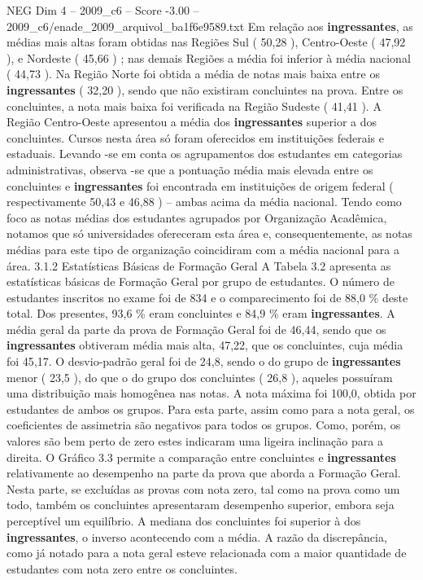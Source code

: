 \begin{textsample}{NEG Dim 4 – 2009\_c6 – Score -3.00 – 2009\_c6/enade\_2009\_arquivol\_ba1f6e9589.txt}
Em relação aos \textbf{ingressantes}, as médias mais altas foram obtidas nas Regiões Sul ( 50,28 ), Centro-Oeste ( 47,92 ), e Nordeste ( 45,66 ) ; nas demais Regiões a média foi inferior à média nacional ( 44,73 ).
Na Região Norte foi obtida a média de notas mais baixa entre os \textbf{ingressantes} ( 32,20 ), sendo que não existiram concluintes na prova.
Entre os concluintes, a nota mais baixa foi verificada na Região Sudeste ( 41,41 ).
A Região Centro-Oeste apresentou a média dos \textbf{ingressantes} superior a dos concluintes.
Cursos nesta área só foram oferecidos em instituições federais e estaduais.
Levando -se em conta os agrupamentos dos estudantes em categorias administrativas, observa -se que a pontuação média mais elevada entre os concluintes e \textbf{ingressantes} foi encontrada em instituições de origem federal ( respectivamente 50,43 e 46,88 ) – ambas acima da média nacional.
Tendo como foco as notas médias dos estudantes agrupados por Organização Acadêmica, notamos que só universidades ofereceram esta área e, consequentemente, as notas médias para este tipo de organização coincidiram com a média nacional para a área. 3.1.2 Estatísticas Básicas de Formação Geral A Tabela 3.2 apresenta as estatísticas básicas de Formação Geral por grupo de estudantes.
O número de estudantes inscritos no exame foi de 834 e o comparecimento foi de 88,0 \% deste total.
Dos presentes, 93,6 \% eram concluintes e 84,9 \% eram \textbf{ingressantes}.
A média geral da parte da prova de Formação Geral foi de 46,44, sendo que os \textbf{ingressantes} obtiveram média mais alta, 47,22, que os concluintes, cuja média foi 45,17.
O desvio-padrão geral foi de 24,8, sendo o do grupo de \textbf{ingressantes} menor ( 23,5 ), do que o do grupo dos concluintes ( 26,8 ), aqueles possuíram uma distribuição mais homogênea nas notas.
A nota máxima foi 100,0, obtida por estudantes de ambos os grupos.
Para esta parte, assim como para a nota geral, os coeficientes de assimetria são negativos para todos os grupos.
Como, porém, os valores são bem perto de zero estes indicaram uma ligeira inclinação para a direita.
O Gráfico 3.3 permite a comparação entre concluintes e \textbf{ingressantes} relativamente ao desempenho na parte da prova que aborda a Formação Geral.
Nesta parte, se excluídas as provas com nota zero, tal como na prova como um todo, também os concluintes apresentaram desempenho superior, embora seja perceptível um equilíbrio.
A mediana dos concluintes foi superior à dos \textbf{ingressantes}, o inverso acontecendo com a média.
A razão da discrepância, como já notado para a nota geral esteve relacionada com a maior quantidade de estudantes com nota zero entre os concluintes.

\end{textsample}
